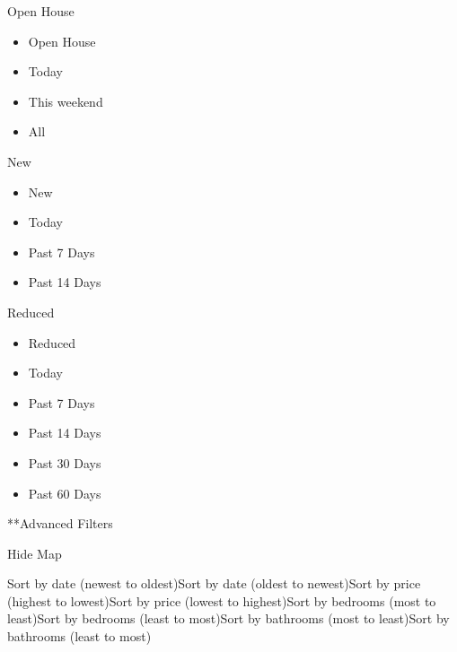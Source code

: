 Open House

\begin{itemize}
\tightlist
\item
  Open House
\item
  Today
\item
  This weekend
\item
  All
\end{itemize}

New

\begin{itemize}
\tightlist
\item
  New
\item
  Today
\item
  Past 7 Days
\item
  Past 14 Days
\end{itemize}

Reduced

\begin{itemize}
\tightlist
\item
  Reduced
\item
  Today
\item
  Past 7 Days
\item
  Past 14 Days
\item
  Past 30 Days
\item
  Past 60 Days
\end{itemize}

**Advanced Filters

Hide Map

Sort by date (newest to oldest)Sort by date (oldest to newest)Sort by
price (highest to lowest)Sort by price (lowest to highest)Sort by
bedrooms (most to least)Sort by bedrooms (least to most)Sort by
bathrooms (most to least)Sort by bathrooms (least to most)

